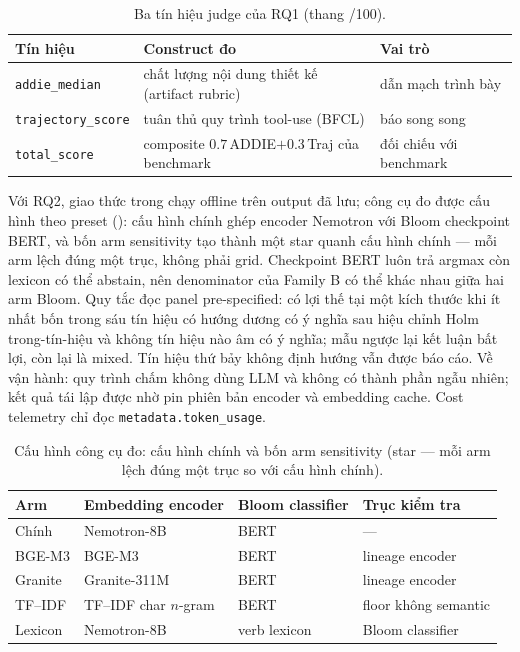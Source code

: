 \begin{table}[t]
  \caption{Ba tín hiệu judge của RQ1 (thang /100).}
  \label{tab:judge-signals}
  \small
  \begin{tabular}{@{}lp{}p{}@{}}
    \toprule
    Tín hiệu & Construct đo & Vai trò \\
    \midrule
    \texttt{addie\_median} & chất lượng nội dung thiết kế (artifact rubric) &
    dẫn mạch trình bày \\
    \texttt{trajectory\_score} & tuân thủ quy trình tool-use (BFCL) &
    báo song song \\
    \texttt{total\_score} & composite $0.7\,$ADDIE$+0.3\,$Traj của benchmark &
    đối chiếu với benchmark \\
    \bottomrule
  \end{tabular}
\end{table}

Với RQ2, giao thức trong  chạy offline trên output đã lưu;
công cụ đo được cấu hình theo preset (): cấu hình chính ghép
encoder Nemotron với Bloom checkpoint BERT, và bốn arm sensitivity tạo thành một
star quanh cấu hình chính --- mỗi arm lệch đúng một trục, không phải grid.
Checkpoint BERT luôn trả argmax còn lexicon có thể abstain, nên denominator của
Family B có thể khác nhau giữa hai arm Bloom. Quy tắc đọc panel pre-specified: có
lợi thế tại một kích thước khi ít nhất bốn trong sáu tín hiệu có hướng dương có ý
nghĩa sau hiệu chỉnh Holm trong-tín-hiệu và không tín hiệu nào âm có ý nghĩa; mẫu
ngược lại kết luận bất lợi, còn lại là mixed. Tín hiệu thứ bảy không định hướng
vẫn được báo cáo. Về vận hành: quy trình chấm không dùng LLM và không có thành phần ngẫu nhiên; kết quả tái lập được nhờ pin phiên bản encoder và embedding cache.
Cost telemetry chỉ đọc \texttt{metadata.token\_usage}.

\begin{table}[t]
  \caption{Cấu hình công cụ đo: cấu hình chính và bốn arm sensitivity (star ---
  mỗi arm lệch đúng một trục so với cấu hình chính).}
  \label{tab:rq2-arms}
  \small
  \begin{tabular}{@{}lllp{}@{}}
    \toprule
    Arm & Embedding encoder & Bloom classifier & Trục kiểm tra \\
    \midrule
    Chính & Nemotron-8B~\cite{babakhin2025nemotron} &
    BERT~\cite{li2022bloomclassification} & --- \\
    BGE-M3 & BGE-M3~\cite{chen2024m3embedding} & BERT & lineage encoder \\
    Granite & Granite-311M~\cite{awasthy2026granite} & BERT & lineage encoder \\
    TF--IDF & TF--IDF char $n$-gram & BERT & floor không semantic \\
    Lexicon & Nemotron-8B & verb lexicon~\cite{anderson2001taxonomy} &
    Bloom classifier \\
    \bottomrule
  \end{tabular}
\end{table}

